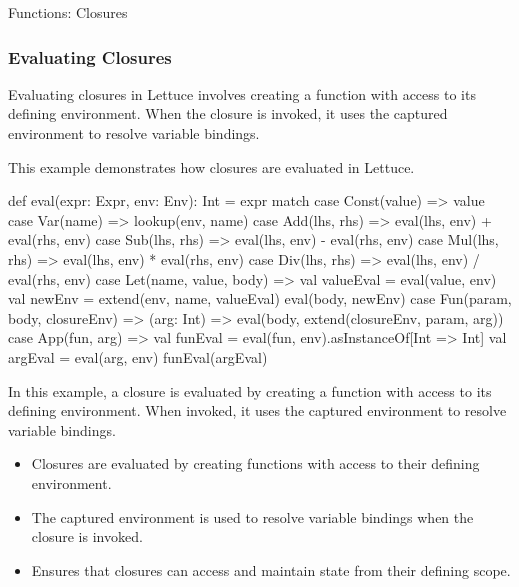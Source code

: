 \begin{notes}{Functions: Closures}
\begin{highlight}
    \end{highlight}
    
    \subsubsection*{Evaluating Closures}
    
    Evaluating closures in Lettuce involves creating a function with access to its defining environment. When the closure is invoked, it uses the captured environment to resolve variable bindings.
    
    \begin{highlight}
    
        This example demonstrates how closures are evaluated in Lettuce.
    
    \begin{code}[Scala]
    def eval(expr: Expr, env: Env): Int = expr match {
        case Const(value) => value
        case Var(name) => lookup(env, name)
        case Add(lhs, rhs) => eval(lhs, env) + eval(rhs, env)
        case Sub(lhs, rhs) => eval(lhs, env) - eval(rhs, env)
        case Mul(lhs, rhs) => eval(lhs, env) * eval(rhs, env)
        case Div(lhs, rhs) => eval(lhs, env) / eval(rhs, env)
        case Let(name, value, body) => 
            val valueEval = eval(value, env)
            val newEnv = extend(env, name, valueEval)
            eval(body, newEnv)
        case Fun(param, body, closureEnv) => 
            (arg: Int) => eval(body, extend(closureEnv, param, arg))
        case App(fun, arg) => 
            val funEval = eval(fun, env).asInstanceOf[Int => Int]
            val argEval = eval(arg, env)
            funEval(argEval)
    }
    \end{code}
    
        In this example, a closure is evaluated by creating a function with access to its defining environment. When invoked, it uses the captured environment to resolve variable bindings.
    
        \begin{itemize}
            \item Closures are evaluated by creating functions with access to their defining environment.
            \item The captured environment is used to resolve variable bindings when the closure is invoked.
            \item Ensures that closures can access and maintain state from their defining scope.
        \end{itemize}
    

\end{highlight}
\end{notes}
